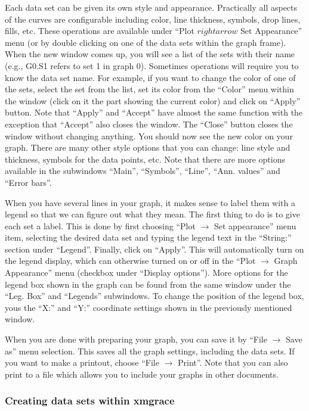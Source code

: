 \documentclass[byrevtex,amssymb,aps,pra,floatfix,letterpaper]{revtex4}
\begin{document}
Each data set can be given its own style and appearance. Practically all aspects of the curves are configurable including color, line thickness, symbols, drop lines, fills, etc. These operations are available under ``Plot $rightarrow$ Set Appearance'' menu (or by double clicking on one of the data sets within the graph frame). When the new window comes up, you will see a list of the sets with their name (e.g., G0.S1 refers to set 1 in graph 0). Sometimes operations will require you to know the data set name. For example,
if you want to change the color of one of the sets, select the set from the list, set its color from the ``Color'' menu within the window (click on it the part showing the current color) and click on ``Apply'' button. Note that ``Apply'' and ``Accept'' have almost the same function with the exception that ``Accept'' also closes the window. The ``Close'' button closes the window without changing anything. You should now see the new color on your graph. There are many other style options that you can change: line style and thickness, symbols for the data points, etc. Note that there are more options available in the subwindows ``Main'', ``Symbols'', ``Line'', ``Ann. values'' and ``Error bars''.

When you have several lines in your graph, it makes sense to label them with a legend so that we can figure out what they mean. The first thing to do is to give each set a label. This is done by first choosing ``Plot $\rightarrow$ Set appearance'' menu item, selecting the desired data set and typing the legend text in the ``String:'' section under ``Legend''. Finally, click on ``Apply''. This will automatically turn on the legend display, which can otherwise turned on or off in the ``Plot $\rightarrow$ Graph Appearance'' menu (checkbox under ``Display options''). More options for the legend box shown in the graph can be found from the same window under the ``Leg. Box'' and ``Legends'' subwindows. To change the position of the legend box, yous the ``X:'' and ``Y:'' coordinate settings shown in the previously mentioned window.

When you are done with preparing your graph, you can save it by ``File $\rightarrow$ Save as'' menu selection. This saves all the graph settings, including the data sets. If you want to make a printout, choose ``File $\rightarrow$ Print''. Note that you can also print to a file which allows you to include your graphs in other documents.

\subsubsection{Creating data sets within xmgrace}
\end{document}
